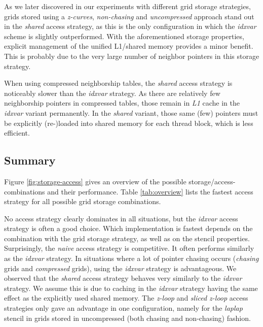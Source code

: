 As we later discovered in our experiments with different grid storage strategies, grids stored using a \emph{z-curves}, \emph{non-chasing} and \emph{uncompressed} approach stand out in the \emph{shared} access strategy, as this is the only configuration in which the \emph{idxvar} scheme is slightly outperformed. With the aforementioned storage properties, explicit management of the unified L1/shared memory provides a minor benefit. This is probably due to the very large number of neighbor pointers in this storage strategy.

When using compressed neighborship tables, the \emph{shared} access strategy is noticeably slower than the \emph{idxvar} strategy. As there are relatively few neighborship pointers in compressed tables, those remain in \emph{L1} cache in the \emph{idxvar} variant permanently. In the \emph{shared} variant, those same (few) pointers must be explicitly (re-)loaded into shared memory for each thread block, which is less efficient.






\subsection{Summary}

Figure \ref{fig:storage-access} gives an overview of the possible storage/access-combinations and their performance. Table \ref{tab:overview} lists the fastest access strategy for all possible grid storage combinations.

No access strategy clearly dominates in all situations, but the \emph{idxvar} access strategy is often a good choice. Which implementation is fastest depends on the combination with the grid storage strategy, as well as on the stencil properties. Surprisingly, the \emph{naive} access strategy is competitive. It often performs similarly as the \emph{idxvar} strategy. In situations where a lot of pointer chasing occurs (\emph{chasing} grids and \emph{compressed} grids), using the \emph{idxvar} strategy is advantageous. We observed that the \emph{shared} access strategy behaves very similarly to the \emph{idxvar} strategy. We assume this is due to caching in the \emph{idxvar} strategy having the same effect as the explicitly used shared memory. The \emph{z-loop} and \emph{sliced z-loop} access strategies only gave an advantage in one configuration, namely for the \emph{laplap} stencil in grids stored in uncompressed (both chasing and non-chasing) fashion.

